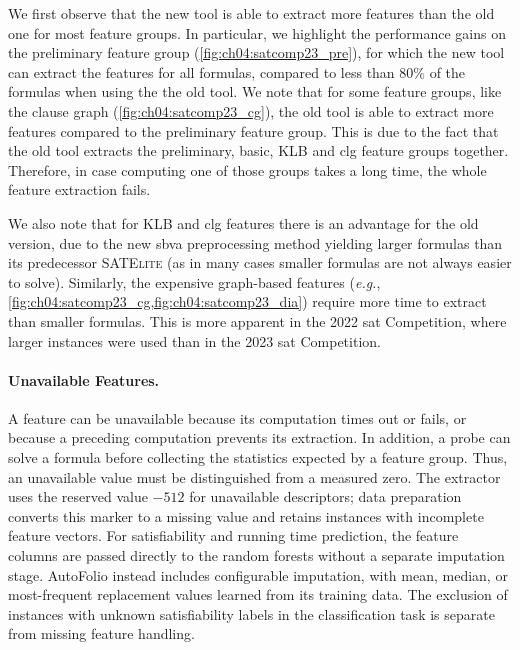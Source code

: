 We first observe that the new tool is able to extract more features than the old one for most feature groups. In particular, we highlight the performance gains on the preliminary feature group (\cref{fig:ch04:satcomp23_pre}), for which the new tool can extract the features for all formulas, compared to less than $80\%$ of the formulas when using the the old tool. We note that for some feature groups, like the clause graph (\cref{fig:ch04:satcomp23_cg}), the old tool is able to extract more features compared to the preliminary feature group. This is due to the fact that the old tool extracts the preliminary, basic, KLB and \gls{clg} feature groups together. Therefore, in case computing one of those groups takes a long time, the whole feature extraction fails.

We also note that for KLB and \gls{clg} features there is an advantage for the old version, due to the new \gls{sbva} preprocessing method yielding larger formulas than its predecessor \textsc{SATElite} (as in many cases smaller formulas are not always easier to solve). Similarly, the expensive graph-based features (\emph{e.g.}, \cref{fig:ch04:satcomp23_cg,fig:ch04:satcomp23_dia}) require more time to extract than smaller formulas.
This is more apparent in the 2022 \gls{sat} Competition, where larger instances were used than in the 2023 \gls{sat} Competition.

\paragraph{Unavailable Features.}
A feature can be unavailable because its computation times out or fails, or because a preceding computation prevents its extraction. In addition, a probe can solve a formula before collecting the statistics expected by a feature group. Thus, an unavailable value must be distinguished from a measured zero. The extractor uses the reserved value $-512$ for unavailable descriptors; data preparation converts this marker to a missing value and retains instances with incomplete feature vectors. For satisfiability and running time prediction, the feature columns are passed directly to the random forests without a separate imputation stage. AutoFolio instead includes configurable imputation, with mean, median, or most-frequent replacement values learned from its training data. The exclusion of instances with unknown satisfiability labels in the classification task is separate from missing feature handling.

